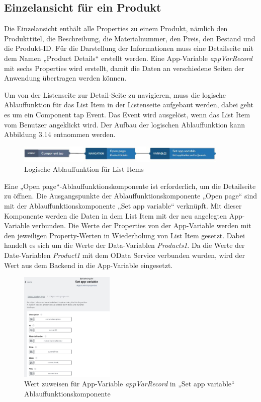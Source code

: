 \subsection{Einzelansicht für ein Produkt}
Die Einzelansicht enthält alle Properties zu einem Produkt, nämlich den Produkttitel, die Beschreibung, die Materialnummer, den Preis, den Bestand und die Produkt-ID. Für die Darstellung der Informationen muss eine Detailseite mit dem Namen „Product Details“ erstellt werden. Eine App-Variable \textit{appVarRecord} mit sechs Properties wird erstellt, damit die Daten an verschiedene Seiten der Anwendung übertragen werden können.

Um von der Listenseite zur Detail-Seite zu navigieren, muss die logische Ablauffunktion für das List Item in der Listenseite aufgebaut werden, dabei geht es um ein Component tap Event. Das Event wird ausgelöst, wenn das List Item vom Benutzer angeklickt wird. Der Aufbau der logischen Ablauffunktion kann Abbildung 3.14 entnommen werden. 
\begin{figure}[htbp]
 \centering
 \includegraphics[width=0.9\textwidth]{Bilder/appgyver/3_14_Logik_ListItem.JPG}
 \caption{Logische Ablauffunktion für List Items}
\end{figure}

Eine „Open page“-Ablauffunktionskomponente ist erforderlich, um die Detailseite zu öffnen. Die Ausgangspunkte der Ablauffunktionskomponente „Open page“ sind mit der Ablauffunktionskomponente „Set app variable“ verknüpft. Mit dieser Komponente werden die Daten in dem List Item mit der neu angelegten App-Variable verbunden. Die Werte der Properties von der App-Variable werden mit den jeweiligen Property-Werten in Wiederholung von List Item gesetzt. Dabei handelt es sich um die Werte der Data-Variablen \textit{Products1}. Da die Werte der Date-Variablen \textit{Product1} mit dem OData Service verbunden wurden, wird der Wert aus dem Backend in die App-Variable eingesetzt.

\begin{figure}[htbp]
 \centering
 \includegraphics[width=0.4\textwidth]{Bilder/appgyver/3_15_set_app_variable.JPG}
 \caption{Wert zuweisen für App-Variable \textit{appVarRecord} in „Set app variable“ Ablauffunktionskomponente}
\end{figure}

